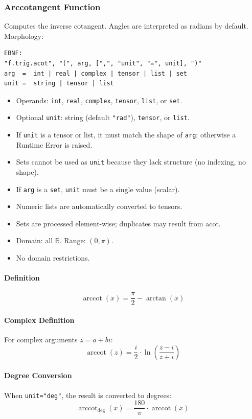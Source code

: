 \subsubsection{Arccotangent Function}
Computes the inverse cotangent. Angles are interpreted as radians by default.\\
Morphology:
\begin{verbatim}
EBNF:
"f.trig.acot", "(", arg, [",", "unit", "=", unit], ")"
arg  =  int | real | complex | tensor | list | set
unit =  string | tensor | list
\end{verbatim}
\begin{itemize}
\item Operands: \texttt{int}, \texttt{real}, \texttt{complex}, \texttt{tensor}, \texttt{list}, or \texttt{set}.
\item Optional \texttt{unit}: string (default \texttt{"rad"}), \texttt{tensor}, or \texttt{list}.
\item If \texttt{unit} is a tensor or list, it must match the shape of \texttt{arg}; otherwise a Runtime Error is raised.
\item Sets cannot be used as \texttt{unit} because they lack structure (no indexing, no shape).
\item If \texttt{arg} is a \texttt{set}, \texttt{unit} must be a single value (scalar).
\item Numeric lists are automatically converted to tensors.
\item Sets are processed element-wise; duplicates may result from acot.
\item Domain: all $\mathbb{R}$. Range: $(0, \pi)$.
\item No domain restrictions.
\end{itemize}

\paragraph{Definition}
\[
\operatorname{arccot}(x) = \frac{\pi}{2} - \arctan(x)
\]

\paragraph{Complex Definition}
For complex arguments $z = a + bi$:
\[
\operatorname{arccot}(z) = \frac{i}{2} \cdot \ln\left(\frac{z - i}{z + i}\right)
\]

\paragraph{Degree Conversion}
When \texttt{unit="deg"}, the result is converted to degrees:
\[
\operatorname{arccot}_{\text{deg}}(x) = \frac{180}{\pi} \cdot \operatorname{arccot}(x)
\]

